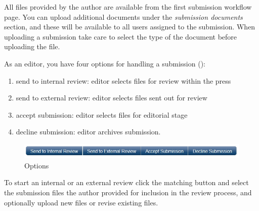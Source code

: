 

All files provided by the author are available from the first submission workflow page. You can upload additional documents under the \textit{submission documents} section, and these will be available to all users assigned to the submission. When uploading a submission take care to select the type of the document before uploading the file. 

As an editor, you have four options for handling a submission (): 
\begin{enumerate}[noitemsep]
\item send to internal review: editor selects files for review within the press
\item send to external review: editor selects files sent out for review
\item accept submission: editor selects files for editorial stage
\item decline submission: editor archives submission.
\end{enumerate}

\begin{figure}[h] \centering
\includegraphics[width=1\textwidth]{./img/options.jpg} \caption{Options}
\label{fig:options}
\end{figure}

To start an internal or an external review click the matching button and select the submission files the author provided for inclusion in the review process, and optionally upload new files or revise existing files. %



